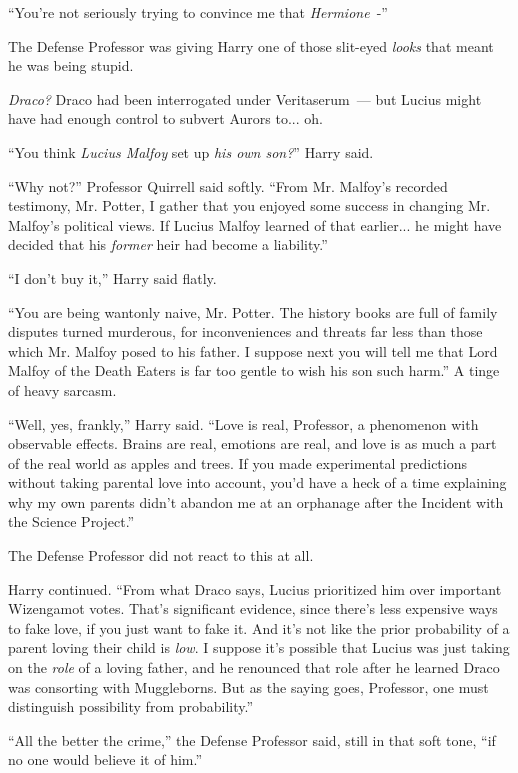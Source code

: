 ``You're not seriously trying to convince me that \emph{Hermione}~-''

The Defense Professor was giving Harry one of those slit-eyed \emph{looks} that meant he was being stupid.

\emph{Draco?} Draco had been interrogated under Veritaserum~--- but Lucius might have had enough control to subvert Aurors to... oh.

``You think \emph{Lucius Malfoy} set up \emph{his own son?}'' Harry said.

``Why not?'' Professor Quirrell said softly. ``From Mr. Malfoy's recorded testimony, Mr. Potter, I gather that you enjoyed some success in changing Mr. Malfoy's political views. If Lucius Malfoy learned of that earlier... he might have decided that his \emph{former} heir had become a liability.''

``I don't buy it,'' Harry said flatly.

``You are being wantonly naive, Mr. Potter. The history books are full of family disputes turned murderous, for inconveniences and threats far less than those which Mr. Malfoy posed to his father. I suppose next you will tell me that Lord Malfoy of the Death Eaters is far too gentle to wish his son such harm.'' A tinge of heavy sarcasm.

``Well, yes, frankly,'' Harry said. ``Love is real, Professor, a phenomenon with observable effects. Brains are real, emotions are real, and love is as much a part of the real world as apples and trees. If you made experimental predictions without taking parental love into account, you'd have a heck of a time explaining why my own parents didn't abandon me at an orphanage after the Incident with the Science Project.''

The Defense Professor did not react to this at all.

Harry continued. ``From what Draco says, Lucius prioritized him over important Wizengamot votes. That's significant evidence, since there's less expensive ways to fake love, if you just want to fake it. And it's not like the prior probability of a parent loving their child is \emph{low}. I suppose it's possible that Lucius was just taking on the \emph{role} of a loving father, and he renounced that role after he learned Draco was consorting with Muggleborns. But as the saying goes, Professor, one must distinguish possibility from probability.''

``All the better the crime,'' the Defense Professor said, still in that soft tone, ``if no one would believe it of him.''

